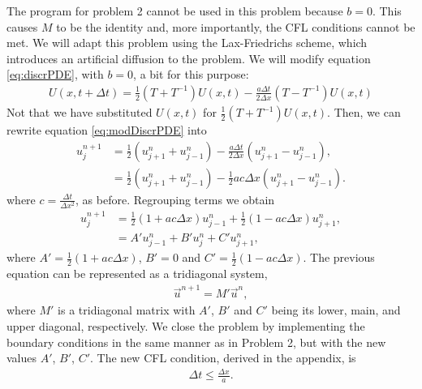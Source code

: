 \begin{questions}
\begin{solution}
\end{solution}
\begin{solution}
The program for problem 2 cannot be used in this problem because $b=0$. This causes $M$ to be the identity and, more importantly, the CFL conditions cannot be met. We will adapt this problem using the Lax-Friedrichs scheme, which introduces an artificial diffusion to the problem. We will modify equation \eqref{eq:discrPDE}, with $b=0$, a bit for this purpose:
\begin{align}\label{eq:modDiscrPDE}
U(x, t+\Delta t) =\frac{1}{2}\left(T+T^{-1}\right) U(x, t)-\frac{a\Delta t}{ 2\Delta x}(T-T^{-1})U(x,t)
\end{align}
Not that we have substituted $U(x,t)$ for $\frac{1}{2}\left(T+T^{-1}\right) U(x, t)$. Then, we can rewrite equation \eqref{eq:modDiscrPDE} into
\begin{align*}
u_j^{n+1} &= \frac{1}{2}\left(u_{j+1}^n+u_{j-1}^n\right)-\frac{a\Delta t}{2\Delta x}\left(u_{j+1}^n-u_{j-1}^n\right),\\
&= \frac{1}{2}\left(u_{j+1}^n+u_{j-1}^n\right)-\frac{1}{2}ac\Delta x\left(u_{j+1}^n-u_{j-1}^n\right).
\end{align*}
where $c = \frac{\Delta t}{\Delta x^2}$, as before. Regrouping terms we obtain
\begin{align}\label{eq:reducedForm}
u_j^{n+1} &= \frac{1}{2}\left(1+ac\Delta x\right)u_{j-1}^n+\frac{1}{2}\left(1-ac\Delta x\right)u_{j+1}^n,\nonumber\\
&= A'u_{j-1}^n + B'u_j^n + C'u_{j+1}^n,
\end{align}
where $A' = \frac{1}{2}\left(1+ac\Delta x\right)$, $B' = 0$ and $C' = \frac{1}{2}\left(1-ac\Delta x\right)$. The previous equation can be represented as a tridiagonal system,
\begin{align}\label{eq:matrixForm}
\vec{u}^{n+1} = M'\vec{u}^n,
\end{align}
where $M'$ is a tridiagonal matrix with $A'$, $B'$ and $C'$ being its lower, main, and upper diagonal, respectively. We close the problem by implementing the boundary conditions in the same manner as  in Problem 2, but with the new values $A'$, $B'$, $C'$. The new CFL condition, derived in the appendix, is 
\begin{align*}
\Delta t\leq\frac{\Delta x}{a}.
\end{align*}


\end{solution}
\end{questions}

